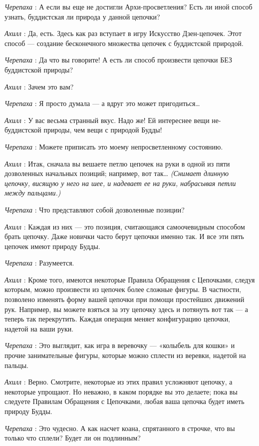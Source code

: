 \emph{Черепаха} : А если вы еще не достигли Архи-просветления? Есть ли иной способ узнать, буддистская ли природа у данной цепочки?

\emph{Ахилл} : Да, есть. Здесь как раз вступает в игру Искусство Дзен-цепочек. Этот способ --- создание бесконечного множества цепочек с буддистской природой.

\emph{Черепаха} : Да что вы говорите! А есть ли способ произвести цепочки БЕЗ буддистской природы?

\emph{Ахилл} : Зачем это вам?

\emph{Черепаха} : Я просто думала --- а вдруг это может пригодиться\ldots{}

\emph{Ахилл} : У вас весьма странный вкус. Надо же! Ей интереснее вещи не-буддистской природы, чем вещи с природой Будды!

\emph{Черепаха} : Можете приписать это моему непросветленному состоянию.

\emph{Ахилл} : Итак, сначала вы вешаете петлю цепочек на руки в одной из пяти дозволенных начальных позиций; например, вот так\ldots{} \emph{(Снимает длинную цепочку, висящую у него на шее, и надевает ее на руки, набрасывая петли между пальцами.)}

\emph{Черепаха} : Что представляют собой дозволенные позиции?

\emph{Ахилл} : Каждая из них --- это позиция, считающаяся самоочевидным способом брать цепочку. Даже новички часто берут цепочки именно так. И все эти пять цепочек имеют природу Будды.

\emph{Черепаха} : Разумеется.

\emph{Ахилл} : Кроме того, имеются некоторые Правила Обращения с Цепочками, следуя которым, можно произвести из цепочек более сложные фигуры. В частности, позволено изменять форму вашей цепочки при помощи простейших движений рук. Например, вы можете взяться за эту цепочку здесь и потянуть вот так --- а теперь так перекрутить. Каждая операция меняет конфигурацию цепочки, надетой на ваши руки.

\emph{Черепаха} : Это выглядит, как игра в веревочку --- «колыбель для кошки» и прочие занимательные фигуры, которые можно сплести из веревки, надетой на пальцы.

\emph{Ахилл} : Верно. Смотрите, некоторые из этих правил усложняют цепочку, а некоторые упрощают. Но неважно, в каком порядке вы это делаете; пока вы следуете Правилам Обращения с Цепочками, любая ваша цепочка будет иметь природу Будды.

\emph{Черепаха} : Это чудесно. А как насчет коана, спрятанного в строчке, что вы только что сплели? Будет ли он подлинным?

